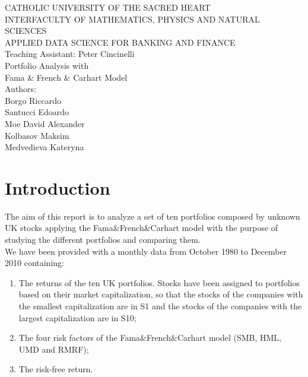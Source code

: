 \documentclass[11pt]{article}
\begin{document}
\onehalfspacing

\begin{center}
\MakeUppercase{Catholic University of the Sacred Heart\\
Interfaculty of Mathematics, Physics and Natural Sciences\\
Applied Data Science for Banking and Finance}\\
\vspace{1cm}
Teaching Assistant: Peter Cincinelli \\
\vspace{24pt}
\huge Portfolio Analysis with \\ Fama \& French \& Carhart Model\\
\vspace{144pt}
\LARGE Authors: \\ 
\large Borgo Riccardo\\
Santucci Edoardo\\
Moe David Alexander \\
Kolbasov Maksim\\
Medvedieva Kateryna\\
\end{center}

\clearpage
\tableofcontents
\clearpage
\listoffigures
\clearpage
\listoftables
\clearpage


\section{Introduction}

The aim of this report is to analyze a set of ten portfolios composed by unknown UK stocks applying the Fama\&French\&Carhart model with the purpose of studying the 
different portfolios and comparing them.\\
We have been provided with a monthly data from October 1980 to December 2010 containing:
\begin{enumerate}
    \item The returns of the ten UK portfolios. Stocks have been assigned to portfolios based on their market capitalization, so that the stocks of the companies with the 
    smallest capitalization are in S1 and the stocks of the companies with the largest capitalization are in S10;
    \item The four risk factors of the Fama\&French\&Carhart model (SMB, HML, UMD and RMRF);
    \item The risk-free return.
\end{enumerate}
\end{document}
